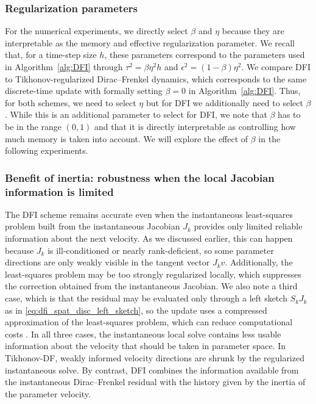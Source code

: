 \documentclass[oneside,11pt]{article}
\theoremstyle{remark}
\theoremstyle{thmstyleone}
\theoremstyle{thmstylethree}
\theoremstyle{thmstyletwo}
\begin{document}
\subsubsection{Regularization parameters}\label{sec:NumExp:AllenCahn:Parameters}
For the numerical experiments, we directly select $\beta$ and $\eta$ because they are interpretable as the memory and effective regularization parameter. We recall that, for a time-step size $h$, these parameters correspond to the  parameters used in Algorithm~\ref{alg:DFI} through $\tau^2=\beta\eta^2h$ and $\epsilon^2=(1-\beta)\eta^2$.
We compare DFI to Tikhonov-regularized Dirac--Frenkel dynamics, which corresponds to the same discrete-time update with formally setting $\beta=0$ in Algorithm~\ref{alg:DFI}. Thus, for both schemes, we need to select $\eta$ but for DFI we additionally need to select $\beta$. While this is an additional parameter to select for DFI, we note that $\beta$ has to be in the range $(0, 1)$ and that it is directly interpretable as controlling how much memory is taken into account. We will explore the effect of $\beta$ in the following experiments.




\subsubsection{Benefit of inertia: robustness when the local Jacobian information is limited} \label{sec:NumExp:JacobianInertiaAllenCahn}
The DFI scheme remains accurate even when the instantaneous least-squares problem built from the instantaneous Jacobian $J_k$ provides only limited reliable information about the next velocity. As we discussed earlier, this can happen because $J_k$ is ill-conditioned or nearly rank-deficient, so some parameter directions are only weakly visible in the tangent vector $J_kv$. Additionally, the least-squares problem may be too strongly  regularized locally, which suppresses the correction obtained from the instantaneous Jacobian. We also note a third case, which is that the residual may be evaluated only through a left sketch $S_kJ_k$ as in \eqref{eq:dfi_spat_disc_left_sketch}, so the update uses a compressed approximation of the least-squares problem, which can reduce computational costs  \cite{berman2023randomized,dong2025randomizedtimesteppingnonlinearly}. In all three cases, the instantaneous local solve contains less usable information about the velocity that should be taken in parameter space. In Tikhonov-DF, weakly informed velocity directions are shrunk by the regularized instantaneous solve. By contrast, DFI combines the information available from the instantaneous Dirac--Frenkel residual with the history given by the inertia of the parameter velocity.
\end{document}

